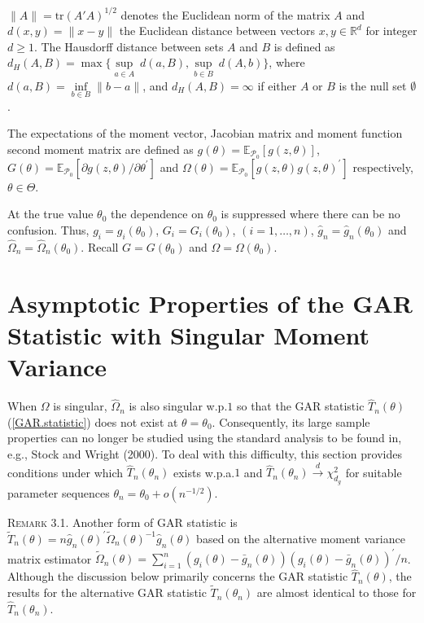 \documentclass[hidelinks, 11 pt, a4paper, pdflatex]{article}
\begin{document}
{  $\|A\| = \mathrm{tr}(A'A)^{1/2}$ denotes the Euclidean norm of the matrix $A$ and $d(x,y) = \|x - y\|$ the Euclidean distance between vectors $x,y \in \mathbb{R}^d$ for integer $d \geq 1$. The Hausdorff distance between sets $A$ and $B$ is defined as $d_{H}(A,B) = \max \{\underset{a \in A}{\sup}~d(a,B), \underset{b \in B} {\sup}~d(A,b)\}$, where $d(a,B) = \underset{b \in B}{\inf} \|b-a\|$, and $d_{H}(A,B) = \infty$ if either $A$ or $B$ is the null set $\emptyset$.

  The expectations of the moment vector, Jacobian matrix and moment function second moment matrix are defined as $g(\theta) = \mathbb{E}_{\mathcal{P}_0}[g(z,\theta)]$, $G(\theta) = \mathbb{E}_{\mathcal{P}_0}[\partial g(z,\theta)/\partial \theta^{\prime}]$ and $\Omega(\theta) = \mathbb{E}_{\mathcal{P}_0}[g(z,\theta)g(z,\theta)^{\prime}]$ respectively, $\theta \in \Theta$.

  At the true value $\theta_0$ the dependence on $\theta_0$ is suppressed where there can be no confusion. Thus, $g_{i} = g_{i}(\theta_0)$, $G_{i} = G_{i}(\theta_0)$, $(i=1,\ldots,n)$, $\hat{g}_{n} = \hat{g}_{n}(\theta_0)$ and $\hat{\Omega}_{n} = \hat{\Omega}_{n}(\theta_0)$. Recall $G = G(\theta_0)$ and $\Omega = \Omega(\theta_0)$.



 \section{Asymptotic Properties of the GAR Statistic with Singular Moment Variance} \label{Sec:GAR.CI}

  \setcounter{equation}{0}

  \indent When $\Omega$ is singular, $\hat{\Omega}_{n}$ is also singular w.p.$1$ so that the GAR statistic $\hat{T}_n(\theta)$ (\ref{GAR.statistic}) does not exist at $\theta = \theta_0$. Consequently, its large sample properties can no longer be studied using the standard analysis to be found in, e.g., Stock and Wright (2000). To deal with this difficulty, this section provides conditions under which $\hat{T}_n(\theta_n)$ exists w.p.a.$1$ and $\hat{T}_n(\theta_n) \overset{d}{\rightarrow} \chi_{d_{g}}^{2}$ for suitable parameter sequences $\theta_n = \theta_0 + o(n^{-1/2})$.

   \textsc{Remark 3.1}. Another form of GAR statistic is $\tilde{T}_n(\theta) =
    n\hat{g}_n(\theta)^{\prime}\tilde{\Omega}_{n}(\theta)^{-1}\hat{g}_n(\theta)$ based on the alternative
    moment variance matrix estimator $\tilde{\Omega}_{n}(\theta) = \sum_{i=1}^{n} (g_{i}(\theta)-\bar{g}_{n}(\theta))(g_{i}(\theta)-\bar{g}_{n}(\theta))^{\prime}/n$. Although the discussion below primarily concerns the GAR statistic $\hat{T}_{n}(\theta)$, the results for the alternative GAR statistic $\tilde{T}_{n}(\theta_n)$ are almost identical to those for $\hat{T}_n(\theta_n)$.

}
\end{document}
